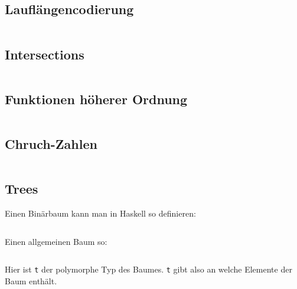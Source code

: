 \inputminted[linenos, numbersep=5pt, tabsize=4, frame=lines, label=hirsch-index.hs]{haskell}{scripts/haskell/hirsch-index.hs}

\subsection{Lauflängencodierung}%

\inputminted[linenos, numbersep=5pt, tabsize=4, frame=lines, label=lauflaengencodierung.hs]{haskell}{scripts/haskell/lauflaengencodierung.hs}

\subsection{Intersections}%

\inputminted[linenos, numbersep=5pt, tabsize=4, frame=lines, label=intersect.hs]{haskell}{scripts/haskell/intersect.hs}

\subsection{Funktionen höherer Ordnung}\label{bsp:foldl-und-foldr}
\inputminted[linenos, numbersep=5pt, tabsize=4, frame=lines, label=folds.hs]{haskell}{scripts/haskell/folds.hs}

\subsection{Chruch-Zahlen}
\inputminted[linenos, numbersep=5pt, tabsize=4, frame=lines, label=church.hs]{haskell}{scripts/haskell/church.hs}

\subsection{Trees}%
Einen Binärbaum kann man in Haskell so definieren:

\inputminted[numbersep=5pt, tabsize=4]{haskell}{scripts/haskell/binary-tree.hs}

Einen allgemeinen Baum so:

\inputminted[numbersep=5pt, tabsize=4]{haskell}{scripts/haskell/general-tree.hs}

Hier ist \texttt{t} der polymorphe Typ des Baumes. \texttt{t} gibt also an welche
Elemente der Baum enthält.


